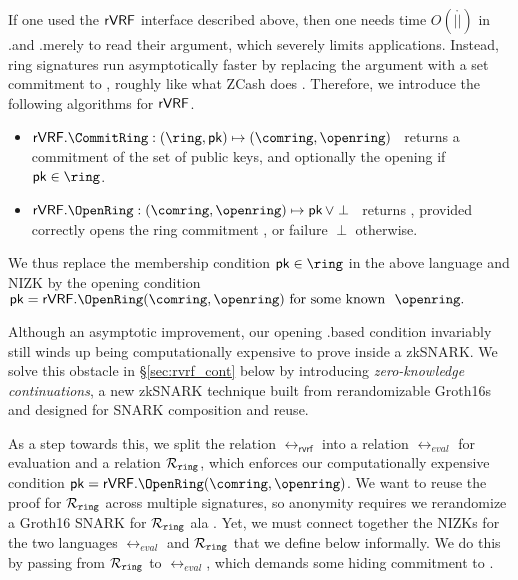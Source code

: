 
If one used the ${\mathsf{rVRF}}$ interface described above, then one needs time
$O(|\ring|)$ in \rVRF.\rSign and \rVRF.\rVerify merely to read their \ring
argument, which severely limits applications.
Instead, ring signatures run asymptotically faster by replacing the \ring
argument with a set commitment to \ring, roughly like what ZCash does \cite{zcash_protocol}. Therefore, we introduce the following algorithms for $ {\mathsf{rVRF}} $.
\begin{itemize} 
	\item $\rVRF.\CommitRing : (\ring,\pk) \mapsto (\comring,\openring)$ \,
	returns a commitment of the set \ring of public keys, and
	optionally the opening \openring if $\pk \in \ring$.
	\item $\rVRF.\OpenRing : (\comring,\openring) \mapsto \pk \, \lor \perp$ \,
	returns \pk, provided \openring correctly opens
	the ring commitment \comring, or failure $\perp$ otherwise.
\end{itemize}

We thus replace the membership condition $\pk \in \ring$ in the above
language and NIZK by the opening condition
$ \pk = \rVRF.\OpenRing(\comring,\openring) \textrm{\ for some known \ } \openring \mathperiod $
%


Although an asymptotic improvement, our opening \rVRF.\OpenRing based condition invariably
still winds up being computationally expensive to prove inside a zkSNARK.
We solve this obstacle in \S\ref{sec:rvrf_cont} below by introducing
{\em zero-knowledge continuations}, a new zkSNARK technique built from
rerandomizable Groth16s \cite{Groth16} and designed for SNARK composition and reuse.

As a step towards this, we split the relation $ \rel_{\mathsf{rvrf}} $ into a relation
$ \rel_{eval} $ for \rVRF evaluation and a relation $ \mathcal{R}_{\mathtt{ring}} $, which enforces our
computationally expensive condition $\pk = \rVRF.\OpenRing(\comring,\openring)$.
We want to reuse the proof for $ \mathcal{R}_{\mathtt{ring}} $ across multiple \rVRF signatures, so anonymity
requires we rerandomize a Groth16 SNARK for $ \mathcal{R}_{\mathtt{ring}} $
ala \cite[Theorem 3, Appendix C, pp. 31]{RandomizationGroth16}.
%
Yet, we must connect together the NIZKs for the two languages  $ \rel_{eval} $ and $ \mathcal{R}_{\mathtt{ring}}  $ that we define below informally. We do this by passing \pk from $ \mathcal{R}_{\mathtt{ring}}  $ to $ \rel_{eval} $, which
demands some hiding commitment \compk to \pk.

